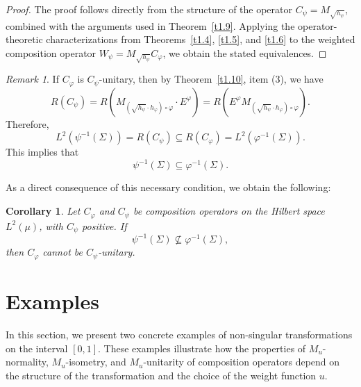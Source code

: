 \documentclass{amsart}
\newtheorem{cor}[thm]{Corollary}
\theoremstyle{definition}\newtheorem{defn}[thm]{Definition}
\theoremstyle{remark}
\newtheorem{rem}[thm]{Remark}
\numberwithin{equation}{section}
\begin{document}
\begin{proof}
The proof follows directly from the structure of the operator \( C_{\psi} = M_{\sqrt{h_{\psi}}} \), combined with the arguments used in Theorem~\ref{t1.9}. Applying the operator-theoretic characterizations from Theorems~\ref{t1.4}, \ref{t1.5}, and \ref{t1.6} to the weighted composition operator \( W_{\psi} = M_{\sqrt{h_{\psi}}} C_{\varphi} \), we obtain the stated equivalences.
\end{proof}
\begin{rem}\label{rem1.12}
If \( C_{\varphi} \) is \( C_{\psi} \)-unitary, then by Theorem~\ref{t1.10}, item (3), we have
\[
R(C_{\psi}) = R\left( M_{(\sqrt{h_{\psi}} \cdot h_{\varphi}) \circ \varphi} \cdot E^{\varphi} \right) = R\left( E^{\varphi} M_{(\sqrt{h_{\psi}} \cdot h_{\varphi}) \circ \varphi} \right).
\]
Therefore,
\[
L^2(\psi^{-1}(\Sigma)) = R(C_{\psi}) \subseteq R(C_{\varphi}) = L^2(\varphi^{-1}(\Sigma)).
\]
This implies that
\[
\psi^{-1}(\Sigma) \subseteq \varphi^{-1}(\Sigma).
\]
\end{rem}

As a direct consequence of this necessary condition, we obtain the following:

\begin{cor}
Let \( C_{\varphi} \) and \( C_{\psi} \) be composition operators on the Hilbert space \( L^2(\mu) \), with \( C_{\psi} \) positive. If
\[
\psi^{-1}(\Sigma) \nsubseteq \varphi^{-1}(\Sigma),
\]
then \( C_{\varphi} \) cannot be \( C_{\psi} \)-unitary.
\end{cor}

\section{Examples}


In this section, we present two concrete examples of non-singular transformations on the interval \( [0,1] \).  
These examples illustrate how the properties of \( M_u \)-normality, \( M_u \)-isometry, and \( M_u \)-unitarity of composition operators depend on the structure of the transformation and the choice of the weight function \( u \).
\end{document}
